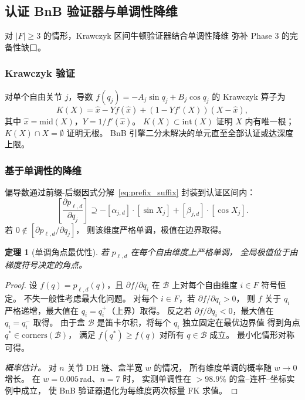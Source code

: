 \documentclass[journal]{IEEEtran}
\newtheorem{theorem}{定理}
\begin{document}
\subsection{认证 BnB 验证器与单调性降维}\label{sec:bnb}

对 $|F|\geq 3$ 的情形，Krawczyk 区间牛顿验证器结合单调性降维
弥补 Phase 3 的完备性缺口。

\subsubsection{Krawczyk 验证}

对单个自由关节 $j$，导数 $f(q_j) = -A_j\sin q_j + B_j\cos q_j$
的 Krawczyk 算子为
\begin{equation}\label{eq:krawczyk}
  K(X) = \hat{x} - Yf(\hat{x}) + (1 - Yf'(X))(X - \hat{x}),
\end{equation}
其中 $\hat{x} = \mathrm{mid}(X)$，$Y = 1/f'(\hat{x})$。
$K(X) \subset \mathrm{int}(X)$ 证明 $X$ 内有唯一根；
$K(X) \cap X = \emptyset$ 证明无根。
BnB 引擎二分未解决的单元直至全部认证或达深度上限。

\subsubsection{基于单调性的降维}

偏导数通过前缀-后缀因式分解~\eqref{eq:prefix_suffix}
封装到认证区间内：
\begin{equation}\label{eq:mono_test}
  \left[\frac{\partial p_{\ell,d}}{\partial q_j}\right]
  \supseteq -[\alpha_{j,d}]\cdot[\sin X_j]
  + [\beta_{j,d}]\cdot[\cos X_j].
\end{equation}
若 $0 \notin [\partial p_{\ell,d}/\partial q_j]$，
则该维度严格单调，极值在边界取得。

\begin{theorem}[单调角点最优性]\label{thm:monotone}
若 $p_{\ell,d}$ 在每个自由维度上严格单调，
全局极值位于由梯度符号决定的角点。
\end{theorem}

\begin{proof}
设 $f(q) = p_{\ell,d}(q)$，且 $\partial f / \partial q_i$
在 $\mathcal{B}$ 上对每个自由维度 $i \in F$ 符号恒定。
不失一般性考虑最大化问题。
对每个 $i \in F$，若 $\partial f / \partial q_i > 0$，
则 $f$ 关于 $q_i$ 严格递增，最大值在 $q_i = q_i^+$（上界）取得。
反之若 $\partial f / \partial q_i < 0$，最大值在 $q_i = q_i^-$ 取得。
由于盒 $\mathcal{B}$ 是笛卡尔积，将每个 $q_i$ 独立固定在最优边界值
得到角点 $q^* \in \mathrm{corners}(\mathcal{B})$，
满足 $f(q^*) \geq f(q)$ 对所有 $q \in \mathcal{B}$ 成立。
最小化情形对称可得。

\emph{概率估计。}
对 $n$ 关节 DH 链、盒半宽 $w$ 的情况，
所有维度单调的概率随 $w \to 0$ 增长。
在 $w = 0.005\,$rad、$n = 7$ 时，
实测单调性在 $>98.9\%$ 的盒--连杆--坐标实例中成立，
使 BnB 验证器退化为每维度两次标量 FK 求值。
\end{proof}
\end{document}
